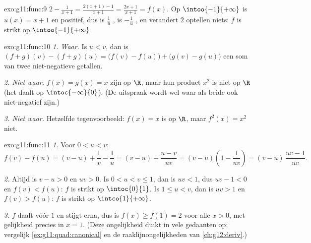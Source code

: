 \begin{solution}{exo:g11:func:9}
$2 - \frac{1}{x+1} = \frac{2(x+1) - 1}{x+1} = \frac{2x+1}{x+1} = f(x)$. Op
$\intoo{-1}{+\infty}$ is $u(x) = x + 1$  en positief, dus is
$\frac1u$ , is $-\frac1u$ , en verandert $2$ optellen niets:
$f$ is strikt  op $\intoo{-1}{+\infty}$.
\end{solution}

\begin{solution}{exo:g11:func:10}
\emph{1. Waar.} Is $u < v$, dan is
$(f+g)(v) - (f+g)(u) = \bigl(f(v)-f(u)\bigr) + \bigl(g(v)-g(u)\bigr)$ een
som van twee niet-negatieve getallen.

\emph{2. Niet waar.} $f(x) = g(x) = x$ zijn  op $\R$, maar hun
product $x^2$ is niet  op $\R$ (het daalt op $\intoc{-\infty}{0}$).
(De uitspraak wordt wel waar als beide  ook niet-negatief zijn.)

\emph{3. Niet waar.} Hetzelfde tegenvoorbeeld: $f(x) = x$ is  op
$\R$, maar $f^2(x) = x^2$ niet.
\end{solution}

\begin{solution}{exo:g11:func:11}
\emph{1.} Voor $0 < u < v$:
\[
f(v) - f(u) = (v - u) + \frac1v - \frac1u
= (v - u) + \frac{u - v}{uv}
= (v - u)\left(1 - \frac{1}{uv}\right)
= (v - u)\,\frac{uv - 1}{uv}.
\]

\emph{2.} Altijd is $v - u > 0$ en $uv > 0$. Is $0 < u < v \leq 1$, dan is
$uv < 1$, dus $uv - 1 < 0$ en $f(v) < f(u)$: $f$ is strikt  op
$\intoc{0}{1}$. Is $1 \leq u < v$, dan is $uv > 1$ en $f(v) > f(u)$: $f$ is
strikt  op $\intco{1}{+\infty}$.

\emph{3.} $f$ daalt vóór $1$ en stijgt erna, dus is $f(x) \geq f(1) = 2$
voor alle $x > 0$, met gelijkheid precies in $x = 1$. (Deze ongelijkheid
duikt in vele gedaanten op; vergelijk \cref{ex:g11:quad:canonical} en de
raaklijnongelijkheden van \cref{ch:g12:deriv}.)
\end{solution}

